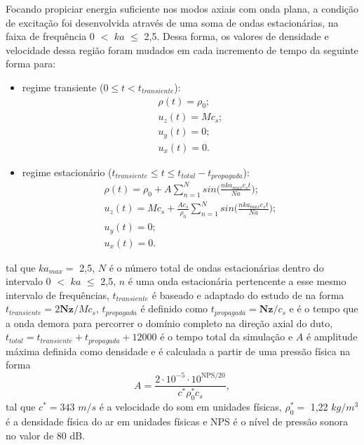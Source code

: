 Focando propiciar energia suficiente nos modos axiais com onda plana, a condição de excitação foi desenvolvida através de uma soma de ondas estacionárias, na faixa de frequência $0$ $<$ $ka$ $\leq$ 2,5. Dessa forma, os valores de densidade e velocidade dessa região foram mudados em cada incremento de tempo da seguinte forma para:
\begin{itemize}
  \item regime transiente ($0 \leq t < t_{transiente}$):
  \begin{gather*}
    \rho(t) = \rho_{0};%
    \\ u_{z}(t) = Mc_{s};    
    \\ u_{y}(t) = 0;
    \\ u_{x}(t) = 0.
  \label{eq:transiente}
  \end{gather*}

  \item regime estacionário ($t_{transiente} \leq t \leq t_{total} - t_{propagada}$):
  \begin{gather*}
    \rho(t) = \rho_{0} + A\sum_{n=1}^{N} sin\bigg(\frac{nka_{max}c_{s}t}{Na}\bigg);
    \\ u_{z}(t) = Mc_{s} + \frac{Ac_{s}}{\rho_{0}}\sum_{n=1}^{N} sin\bigg(\frac{nka_{max}c_{s}t}{Na}\bigg);    
    \\ u_{y}(t) = 0;
    \\ u_{x}(t) = 0.
  \label{eq:estacionario}
  \end{gather*}
\end{itemize}
tal que $ka_{max} =$ 2,5, $N$ é o número total de ondas estacionárias dentro do intervalo $0$ $<$ $ka$ $\leq$ 2,5, $n$ é uma onda estacionária pertencente a esse mesmo intervalo de frequências, $t_{transiente}$ é baseado e adaptado do estudo de  na forma $t_{transiente} =  2\textbf{Nz}/Mc_{s}$, $t_{propagada}$ é definido como $t_{propagada} = \textbf{Nz}/c_{s}$ e é o tempo que a onda demora para percorrer o domínio completo na direção axial do duto, $t_{total} = t_{transiente} + t_{propagada} + 12000$ é o tempo total da simulação e $A$ é amplitude máxima definida como densidade e é calculada a partir de uma pressão física na forma
\begin{equation}
  A = \frac{2 \cdot 10^{-5} \cdot 10^{\text{NPS}/20}}{c^{*}\rho^{*}_{0}c_{s}},
\end{equation}
tal que $c^{*} = 343$ $m/s$ é a velocidade do som em unidades físicas, $\rho^{*}_{0} =$ 1,22 $kg/m^{3}$ é a densidade física do ar em unidades físicas e NPS é o nível de pressão sonora no valor de 80 dB.

